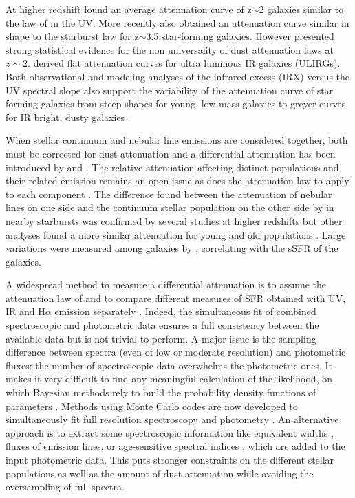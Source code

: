 \documentclass{aa}
\begin{document}
At higher redshift \citet{Reddy15}  found  an average  attenuation curve of z$\sim$2 galaxies  similar to  the law of \citet{Calzetti00} in the UV. More recently \citet{Cullen18} also obtained an attenuation curve similar in shape to the starburst law  for z$\sim$3.5 star-forming galaxies. However \citet{Salmon16} presented  strong statistical evidence for the non universality of dust attenuation laws at $z\sim 2$. \citet{LoFaro17} derived  flat attenuation curves for ultra luminous IR galaxies (ULIRGs). 
Both observational and modeling analyses of the infrared excess (IRX) versus the UV spectral slope  also support the variability of the attenuation curve of star forming galaxies from  steep shapes for young, low-mass galaxies to greyer curves for IR bright, dusty galaxies \citep[e.g.,][]{Salmon16,  LoFaro17, Popping17,Narayanan18}.

When  stellar continuum  and nebular line  emissions   are considered together, both  must  be corrected for dust attenuation and a differential attenuation has been  introduced by \citet{Calzetti00} and \citet{Charlot00}. The relative attenuation affecting  distinct populations and their related emission remains an open issue as does the attenuation law to apply to  each component \citep[e.g.,][]{Garn10-2,Wild11,Chevallard13, Kashino13, Price14, Reddy15, LoFaro17}. The  difference found between the attenuation of  nebular lines on one side and  the continuum stellar population on the other side by \citet{Calzetti00} in  nearby starbursts  was confirmed by several studies  at higher redshifts \citep{Garn10-2,Price14} but other analyses found   a more similar attenuation for  young and old populations \citep{Pannella15, Puglisi16}. Large variations were measured among galaxies by \citet{Reddy15}, correlating with the sSFR  of the galaxies. 

A widespread  method to measure a differential attenuation is to assume the  attenuation law of  \citet{Calzetti00} and to compare different measures of SFR obtained with UV, IR and H$\alpha$ emission separately \citep{Garn10-2,Mancini11, Wuyts11, Puglisi16}. Indeed, the simultaneous fit of  combined spectroscopic and photometric data ensures a full consistency between the available data  but  is not trivial to perform. A major issue is the sampling difference between spectra (even of low or moderate resolution) and  photometric fluxes:  the number of spectroscopic data overwhelms the photometric ones. It makes it very difficult  to find any meaningful calculation of the likelihood, on which  Bayesian methods rely to build the probability density functions of  parameters \citep{Pacifici12}.
Methods using Monte Carlo codes  are now developed to  simultaneously fit full resolution spectroscopy and photometry  \citep{Chevallard16, Fossati18}. 
An alternative approach is to extract  some spectroscopic information like equivalent widths \citep{Pacifici15}, fluxes of emission lines, or  age-sensitive spectral indices \citep{Boselli16}, which are added to the input photometric data. This puts stronger constraints on  the  different stellar populations as well as the amount of dust attenuation while avoiding the oversampling of full spectra.
\end{document}
